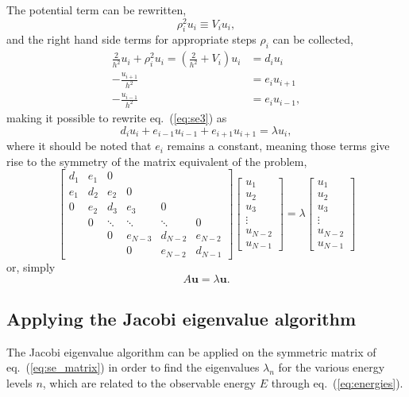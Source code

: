 \documentclass[a4paper,11pt]{article}
\begin{document}
The potential term can be rewritten,
\[ \rho_i^2 u_i \equiv V_i u_i, \]
and the right hand side terms for appropriate steps $\rho_i$ can be collected,
\begin{align*}
    \frac{2}{h^2} u_i + \rho_i^2 u_i = \left( \frac{2}{h^2} + V_i \right) u_i &= d_i u_i \\
    -\frac{u_{i+1}}{h^2} &= e_i u_{i+1} \\
    -\frac{u_{i-1}}{h^2} &= e_i u_{i-1},
\end{align*}
making it possible to rewrite eq.~(\ref{eq:se3}) as
\[ d_i u_i + e_{i-1} u_{i-1} + e_{i+1} u_{i+1} = \lambda u_i, \]
where it should be noted that $e_i$ remains a constant, meaning those terms give rise to the symmetry of the matrix equivalent of the problem,
\begin{equation}
    \begin{bmatrix}
        d_1     & e_1   & 0     &       &       &  \\
        e_1     & d_2   & e_2   & 0     &       &  \\
        0       & e_2   & d_3   & e_3   & 0     &  \\
                & 0     &\ddots & \ddots& \ddots& 0\\
                &       & 0     &e_{N-3}&d_{N-2}&e_{N-2} \\
                &       &       & 0     &e_{N-2}&d_{N-1}
    \end{bmatrix}
    \begin{bmatrix}
        u_1 \\ u_2 \\ u_3 \\ \vdots \\ u_{N-2} \\ u_{N-1}
    \end{bmatrix}
     =
    \lambda
    \begin{bmatrix}
        u_1 \\ u_2 \\ u_3 \\ \vdots \\ u_{N-2} \\ u_{N-1}
    \end{bmatrix}
    \label{eq:se_matrix}
\end{equation}
or, simply
\begin{equation}
    A \mathbf{u} = \lambda \mathbf{u}.
    \label{eq:se_vector}
\end{equation}


\subsection{Applying the Jacobi eigenvalue algorithm}
The Jacobi eigenvalue algorithm can be applied on the symmetric matrix of eq.~(\ref{eq:se_matrix}) in order to find the eigenvalues $\lambda_n$ for the various energy levels $n$, which are related to the observable energy $E$ through eq.~(\ref{eq:energies}). 
\end{document}
